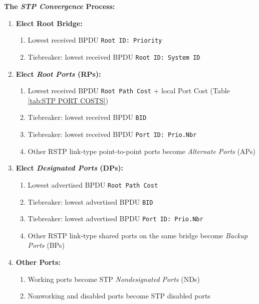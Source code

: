 \documentclass[12pt]{article}
\begin{document}
	\textbf{The \textit{STP Convergence} Process:}
	\begin{enumerate}
		\label{itm:STP CONVERGENCE}
		\item{\textbf{Elect Root Bridge:}}
		\begin{enumerate} \itemsep -5pt
			\item{Lowest received BPDU \texttt{Root ID: Priority}}
			\item{Tiebreaker: lowest received BPDU \texttt{Root ID: System ID}}
		\end{enumerate}
		\item{\textbf{Elect \textit{Root Ports} (RPs):}}
		\begin{enumerate} \itemsep -5pt
			\item{Lowest received BPDU \texttt{Root Path Cost} + local Port Cost (Table \ref{tab:STP PORT COSTS})}
			\item{Tiebreaker: lowest received BPDU \texttt{BID}}
			\item{Tiebreaker: lowest received BPDU \texttt{Port ID: Prio.Nbr}}
			\item{Other RSTP link-type point-to-point ports become \textit{Alternate Ports} (APs)}
		\end{enumerate}
		\item{\textbf{Elect \textit{Designated Ports} (DPs):}}
		\begin{enumerate} \itemsep -5pt
			\item{Lowest advertised BPDU \texttt{Root Path Cost}}
			\item{Tiebreaker: lowest advertised BPDU \texttt{BID}}
			\item{Tiebreaker: lowest advertised BPDU \texttt{Port ID: Prio.Nbr}}
			\item{Other RSTP link-type shared ports on the same bridge become \textit{Backup Ports} (BPs)}
		\end{enumerate}
		\item{\textbf{Other Ports:}}
		\begin{enumerate} \itemsep -5pt
			\item{Working ports become STP \textit{Nondesignated Ports} (NDs)}
			\item{Nonworking and disabled ports become STP disabled ports}
		\end{enumerate}
	\end{enumerate}
\end{document}
